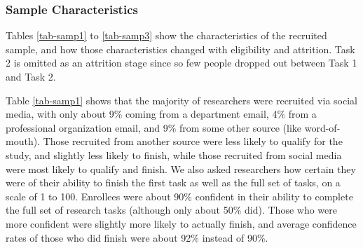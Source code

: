 \documentclass[
  letterpaper,
  DIV=11,
  numbers=noendperiod]{scrartcl}
\begin{document}
\hypertarget{sec-sample-characteristics}{%
\subsubsection{Sample
Characteristics}\label{sec-sample-characteristics}}

Tables \ref{tab-samp1} to \ref{tab-samp3} show the characteristics of
the recruited sample, and how those characteristics changed with
eligibility and attrition. Task 2 is omitted as an attrition stage since
so few people dropped out between Task 1 and Task 2.

Table \ref{tab-samp1} shows that the majority of researchers were
recruited via social media, with only about 9\% coming from a department
email, 4\% from a professional organization email, and 9\% from some
other source (like word-of-mouth). Those recruited from another source
were less likely to qualify for the study, and slightly less likely to
finish, while those recruited from social media were most likely to
qualify and finish. We also asked researchers how certain they were of
their ability to finish the first task as well as the full set of tasks,
on a scale of 1 to 100. Enrollees were about 90\% confident in their
ability to complete the full set of research tasks (although only about
50\% did). Those who were more confident were slightly more likely to
actually finish, and average confidence rates of those who did finish
were about 92\% instead of 90\%.
\end{document}
